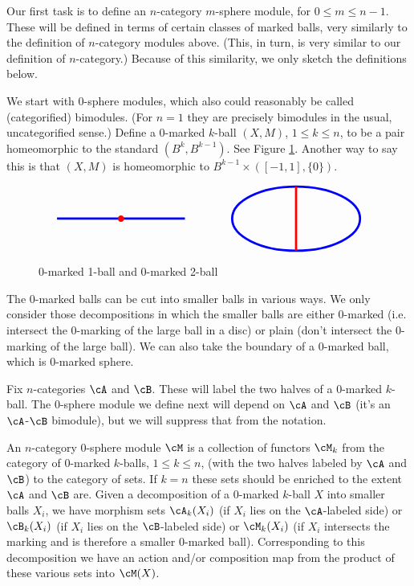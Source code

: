 \medskip

Our first task is to define an $n$-category $m$-sphere module, for $0\le m \le n-1$.
These will be defined in terms of certain classes of marked balls, very similarly
to the definition of $n$-category modules above.
(This, in turn, is very similar to our definition of $n$-category.)
Because of this similarity, we only sketch the definitions below.

We start with $0$-sphere modules, which also could reasonably be called (categorified) bimodules.
(For $n=1$ they are precisely bimodules in the usual, uncategorified sense.)
Define a $0$-marked $k$-ball $(X, M)$, $1\le k \le n$, to be a pair homeomorphic to the standard
$(B^k, B^{k-1})$.
See Figure \ref{feb21a}.
Another way to say this is that $(X, M)$ is homeomorphic to $B^{k-1}\times([-1,1], \{0\})$.

\begin{figure}[!ht]
$$\tikz[baseline,line width=2pt]{\draw[blue] (-2,0)--(2,0); \fill[red] (0,0) circle (0.1);} \qquad \qquad \tikz[baseline,line width=2pt]{\draw[blue] (0,0) circle (2 and 1); \draw[red] (0,1)--(0,-1);}$$
\caption{0-marked 1-ball and 0-marked 2-ball}
\label{feb21a}
\end{figure}

The $0$-marked balls can be cut into smaller balls in various ways.
We only consider those decompositions in which the smaller balls are either
$0$-marked (i.e. intersect the $0$-marking of the large ball in a disc) 
or plain (don't intersect the $0$-marking of the large ball).
We can also take the boundary of a $0$-marked ball, which is $0$-marked sphere.

Fix $n$-categories $\cA$ and $\cB$.
These will label the two halves of a $0$-marked $k$-ball.
The $0$-sphere module we define next will depend on $\cA$ and $\cB$ 
(it's an $\cA$-$\cB$ bimodule), but we will suppress that from the notation.

An $n$-category $0$-sphere module $\cM$ is a collection of functors $\cM_k$ from the category
of $0$-marked $k$-balls, $1\le k \le n$,
(with the two halves labeled by $\cA$ and $\cB$) to the category of sets.
If $k=n$ these sets should be enriched to the extent $\cA$ and $\cB$ are.
Given a decomposition of a $0$-marked $k$-ball $X$ into smaller balls $X_i$, we have
morphism sets $\cA_k(X_i)$ (if $X_i$ lies on the $\cA$-labeled side)
or $\cB_k(X_i)$ (if $X_i$ lies on the $\cB$-labeled side)
or $\cM_k(X_i)$ (if $X_i$ intersects the marking and is therefore a smaller 0-marked ball).
Corresponding to this decomposition we have an action and/or composition map
from the product of these various sets into $\cM(X)$.

